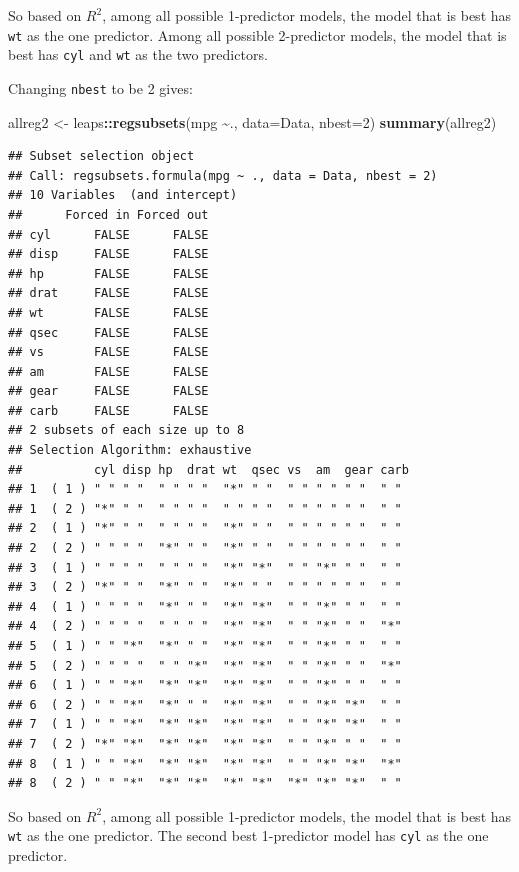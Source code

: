\documentclass[
]{book}
\newenvironment{Shaded}{\begin{snugshade}}{\end{snugshade}}
\newcommand{\AttributeTok}[1]{\textcolor[rgb]{0.13,0.29,0.53}{#1}}
\newcommand{\DecValTok}[1]{\textcolor[rgb]{0.00,0.00,0.81}{#1}}
\newcommand{\FunctionTok}[1]{\textcolor[rgb]{0.13,0.29,0.53}{\textbf{#1}}}
\newcommand{\NormalTok}[1]{#1}
\newcommand{\OtherTok}[1]{\textcolor[rgb]{0.56,0.35,0.01}{#1}}
\newcommand{\SpecialCharTok}[1]{\textcolor[rgb]{0.81,0.36,0.00}{\textbf{#1}}}
\begin{document}
So based on \(R^2\), among all possible 1-predictor models, the model that is best has \texttt{wt} as the one predictor. Among all possible 2-predictor models, the model that is best has \texttt{cyl} and \texttt{wt} as the two predictors.

Changing \texttt{nbest} to be 2 gives:

\begin{Shaded}
\begin{Highlighting}[]
\NormalTok{allreg2 }\OtherTok{\textless{}{-}}\NormalTok{ leaps}\SpecialCharTok{::}\FunctionTok{regsubsets}\NormalTok{(mpg }\SpecialCharTok{\textasciitilde{}}\NormalTok{., }\AttributeTok{data=}\NormalTok{Data, }\AttributeTok{nbest=}\DecValTok{2}\NormalTok{)}
\FunctionTok{summary}\NormalTok{(allreg2)}
\end{Highlighting}
\end{Shaded}

\begin{verbatim}
## Subset selection object
## Call: regsubsets.formula(mpg ~ ., data = Data, nbest = 2)
## 10 Variables  (and intercept)
##      Forced in Forced out
## cyl      FALSE      FALSE
## disp     FALSE      FALSE
## hp       FALSE      FALSE
## drat     FALSE      FALSE
## wt       FALSE      FALSE
## qsec     FALSE      FALSE
## vs       FALSE      FALSE
## am       FALSE      FALSE
## gear     FALSE      FALSE
## carb     FALSE      FALSE
## 2 subsets of each size up to 8
## Selection Algorithm: exhaustive
##          cyl disp hp  drat wt  qsec vs  am  gear carb
## 1  ( 1 ) " " " "  " " " "  "*" " "  " " " " " "  " " 
## 1  ( 2 ) "*" " "  " " " "  " " " "  " " " " " "  " " 
## 2  ( 1 ) "*" " "  " " " "  "*" " "  " " " " " "  " " 
## 2  ( 2 ) " " " "  "*" " "  "*" " "  " " " " " "  " " 
## 3  ( 1 ) " " " "  " " " "  "*" "*"  " " "*" " "  " " 
## 3  ( 2 ) "*" " "  "*" " "  "*" " "  " " " " " "  " " 
## 4  ( 1 ) " " " "  "*" " "  "*" "*"  " " "*" " "  " " 
## 4  ( 2 ) " " " "  " " " "  "*" "*"  " " "*" " "  "*" 
## 5  ( 1 ) " " "*"  "*" " "  "*" "*"  " " "*" " "  " " 
## 5  ( 2 ) " " " "  " " "*"  "*" "*"  " " "*" " "  "*" 
## 6  ( 1 ) " " "*"  "*" "*"  "*" "*"  " " "*" " "  " " 
## 6  ( 2 ) " " "*"  "*" " "  "*" "*"  " " "*" "*"  " " 
## 7  ( 1 ) " " "*"  "*" "*"  "*" "*"  " " "*" "*"  " " 
## 7  ( 2 ) "*" "*"  "*" "*"  "*" "*"  " " "*" " "  " " 
## 8  ( 1 ) " " "*"  "*" "*"  "*" "*"  " " "*" "*"  "*" 
## 8  ( 2 ) " " "*"  "*" "*"  "*" "*"  "*" "*" "*"  " "
\end{verbatim}

So based on \(R^2\), among all possible 1-predictor models, the model that is best has \texttt{wt} as the one predictor. The second best 1-predictor model has \texttt{cyl} as the one predictor.
\end{document}
